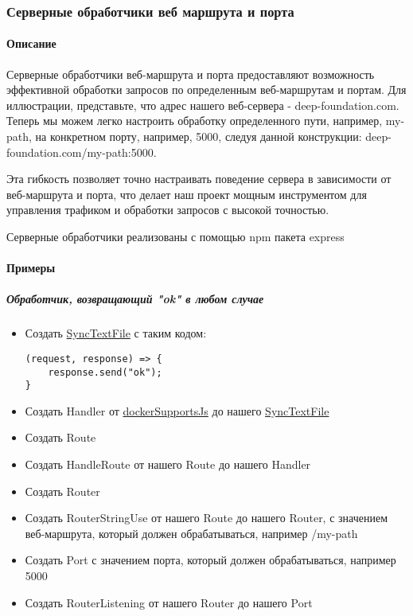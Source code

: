 \documentclass{article}
\begin{document}
\subsubsection{Серверные обработчики веб маршрута и порта}
\paragraph{Описание}
Серверные обработчики веб-маршрута и порта предоставляют возможность
эффективной обработки запросов по определенным веб-маршрутам и портам. Для
иллюстрации, представьте, что адрес нашего веб-сервера - deep-foundation.com.
Теперь мы можем легко настроить обработку определенного пути, например,
my-path, на конкретном порту, например, 5000, следуя данной конструкции:
deep-foundation.com/my-path:5000.

Эта гибкость позволяет точно настраивать поведение сервера в зависимости от
веб-маршрута и порта, что делает наш проект мощным инструментом для управления
трафиком и обработки запросов с высокой точностью.

Серверные обработчики реализованы с помощью npm пакета express
\paragraph{Примеры}
\subparagraph{Обработчик, возвращающий "ok" в любом случае}
\begin{itemize}
  \item Создать \hyperlink{SyncTextFile.Def}{SyncTextFile} с таким кодом:
        \begin{lstlisting}
(request, response) => {
    response.send("ok");
}
\end{lstlisting}
  \item Создать Handler от \hyperlink{dockerSupportsJs.Def}{dockerSupportsJs}
        до нашего \hyperlink{SyncTextFile.Def}{SyncTextFile}
  \item Создать Route
  \item Создать HandleRoute от нашего Route до нашего Handler
  \item Создать Router
  \item Создать RouterStringUse от нашего Route до нашего Router, с значением
        веб-маршрута, который должен обрабатываться, например /my-path
  \item Создать Port с значением порта, который должен обрабатываться, например
        5000
  \item Создать RouterListening от нашего Router до нашего Port
\end{itemize}
\end{document}

